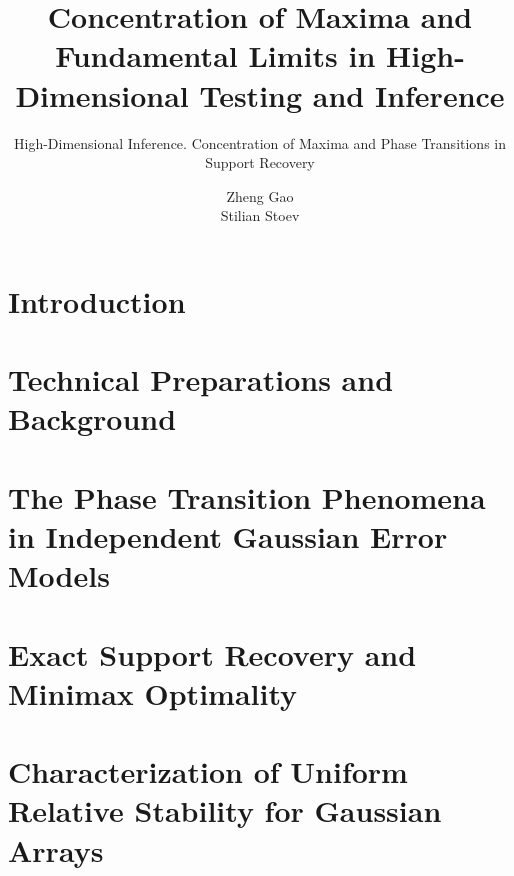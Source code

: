 \documentclass[graybox,envcountchap,sectrefs]{svmono}
\begin{document}
\author{Zheng Gao \\ Stilian Stoev}
\title{Concentration of Maxima and Fundamental Limits in High-Dimensional Testing and Inference}
\subtitle{High-Dimensional Inference. Concentration of Maxima and Phase Transitions in Support Recovery} %
\maketitle

\frontmatter%

%
%
%
%

\tableofcontents





\mainmatter%


\chapter{Introduction}
\label{chap:intro}


\chapter{Technical Preparations and Background}
\label{chap:background}



\chapter{The Phase Transition Phenomena in Independent Gaussian Error Models} 
\label{chap:phase-transitions}



\chapter{Exact Support Recovery and Minimax Optimality} 
\label{chap:exact-support-recovery}


\chapter{Characterization of Uniform Relative Stability for Gaussian Arrays}
\label{chap:URS}

\end{document}
